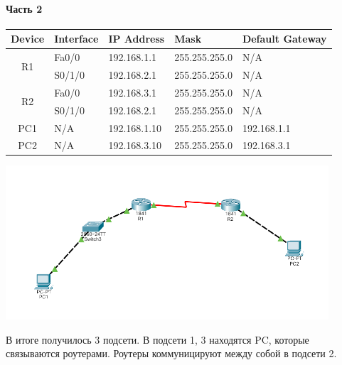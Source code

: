\paragraph{Часть 2}
\begin{center}
    \begin{tabular}{|c|l|l|l|l|}
        \hline
        Device              & Interface & IP Address   & Mask          & Default Gateway \\
        \hline
        \multirow{2}{*}{R1} & Fa0/0     & 192.168.1.1  & 255.255.255.0 & N/A             \\
        \cline{2-5}
        ~                   & S0/1/0    & 192.168.2.1  & 255.255.255.0 & N/A             \\
        \hline
        \multirow{2}{*}{R2} & Fa0/0     & 192.168.3.1  & 255.255.255.0 & N/A             \\
        \cline{2-5}
        ~                   & S0/1/0    & 192.168.2.1  & 255.255.255.0 & N/A             \\
        \hline
        PC1                 & N/A       & 192.168.1.10 & 255.255.255.0 & 192.168.1.1     \\
        \hline
        PC2                 & N/A       & 192.168.3.10 & 255.255.255.0 & 192.168.3.1     \\
        \hline
    \end{tabular}
\end{center}

\includegraphics[width=0.9\textwidth]{resources/topology2}

В итоге получилось 3 подсети.
В подсети 1, 3 находятся PC, которые связываются роутерами.
Роутеры коммуницируют между собой в подсети 2.

